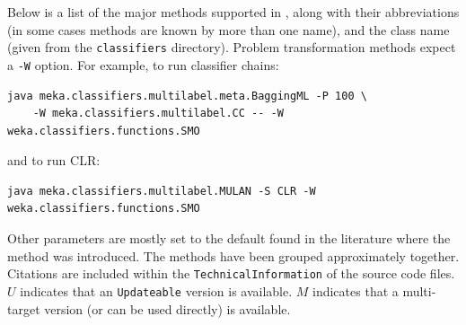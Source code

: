 \documentclass[11pt]{article}
\newcommand{\MEKA}{Meka}
\begin{document}
Below is a list of the major methods supported in \framework{\MEKA}, along with their abbreviations (in some cases methods are known by more than one name), and the class name (given from the \texttt{classifiers} directory). Problem transformation methods expect a \texttt{-W} option. For example, to run classifier chains:
\begin{lstlisting}
java meka.classifiers.multilabel.meta.BaggingML -P 100 \
	-W meka.classifiers.multilabel.CC -- -W weka.classifiers.functions.SMO	
\end{lstlisting}
and to run CLR:
\begin{lstlisting}
java meka.classifiers.multilabel.MULAN -S CLR -W weka.classifiers.functions.SMO	
\end{lstlisting}
Other parameters are mostly set to the default found in the literature where the method was introduced. The methods have been grouped approximately together. Citations are included within the \texttt{TechnicalInformation} of the source code files. $U$ indicates that an \texttt{Updateable} version is available. $M$ indicates that a multi-target version (or can be used directly) is available.\\
\end{document}
